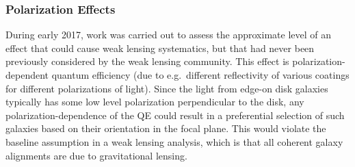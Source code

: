\subsubsection{Polarization Effects}
During early 2017, work was carried out to assess the approximate level of an effect that could
cause weak lensing systematics, but that had never been previously considered by the weak lensing
community.  This effect is polarization-dependent quantum efficiency (due to e.g.\ different
reflectivity of various coatings for different polarizations of light).  Since the light from
edge-on disk galaxies typically has some low level polarization perpendicular to the disk, any
polarization-dependence of the QE could result in a preferential selection of such galaxies based on
their orientation in the focal plane.  This would violate the baseline assumption in a weak lensing
analysis, which is that all coherent galaxy alignments are due to gravitational lensing.

